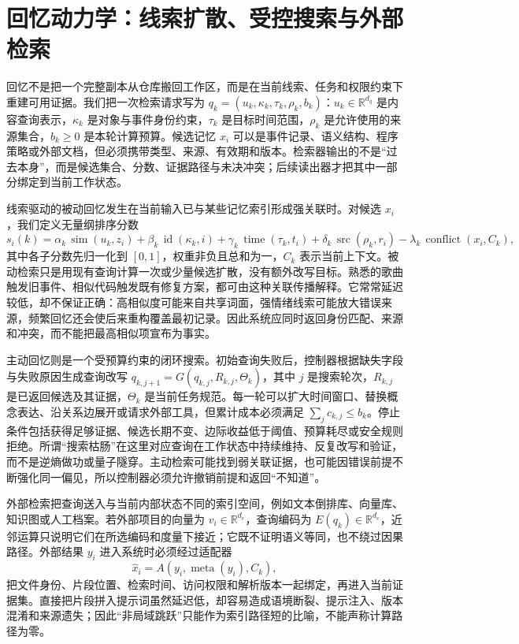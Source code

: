 \section{回忆动力学：线索扩散、受控搜索与外部检索}
\label{sec:recall_dynamics}
回忆不是把一个完整副本从仓库搬回工作区，而是在当前线索、任务和权限约束下重建可用证据。我们把一次检索请求写为 $q_k=(u_k,\kappa_k,\tau_k,\rho_k,b_k)$：$u_k\in\mathbb R^{d_q}$ 是内容查询表示，$\kappa_k$ 是对象与事件身份约束，$\tau_k$ 是目标时间范围，$\rho_k$ 是允许使用的来源集合，$b_k\geq0$ 是本轮计算预算。候选记忆 $x_i$ 可以是事件记录、语义结构、程序策略或外部文档，但必须携带类型、来源、有效期和版本。检索器输出的不是“过去本身”，而是候选集合、分数、证据路径与未决冲突；后续读出器才把其中一部分绑定到当前工作状态。

线索驱动的被动回忆发生在当前输入已与某些记忆索引形成强关联时。对候选 $x_i$，我们定义无量纲排序分数
\[
s_i(k)=\alpha_k\,\operatorname{sim}(u_k,z_i)
+\beta_k\,\operatorname{id}(\kappa_k,i)
+\gamma_k\,\operatorname{time}(\tau_k,t_i)
+\delta_k\,\operatorname{src}(\rho_k,r_i)
-\lambda_k\,\operatorname{conflict}(x_i,C_k),
\]
其中各子分数先归一化到 $[0,1]$，权重非负且总和为一，$C_k$ 表示当前上下文。被动检索只是用现有查询计算一次或少量候选扩散，没有额外改写目标。熟悉的歌曲触发旧事件、相似代码触发既有修复方案，都可由这种关联传播解释。它常常延迟较低，却不保证正确：高相似度可能来自共享词面，强情绪线索可能放大错误来源，频繁回忆还会使后来重构覆盖最初记录。因此系统应同时返回身份匹配、来源和冲突，而不能把最高相似项宣布为事实。

主动回忆则是一个受预算约束的闭环搜索。初始查询失败后，控制器根据缺失字段与失败原因生成查询改写 $q_{k,j+1}=G(q_{k,j},R_{k,j},\Theta_k)$，其中 $j$ 是搜索轮次，$R_{k,j}$ 是已返回候选及其证据，$\Theta_k$ 是当前任务规范。每一轮可以扩大时间窗口、替换概念表达、沿关系边展开或请求外部工具，但累计成本必须满足 $\sum_j c_{k,j}\leq b_k$。停止条件包括获得足够证据、候选长期不变、边际收益低于阈值、预算耗尽或安全规则拒绝。所谓“搜索枯肠”在这里对应查询在工作状态中持续维持、反复改写和验证，而不是逆熵做功或量子隧穿。主动检索可能找到弱关联证据，也可能因错误前提不断强化同一偏见，所以控制器必须允许撤销前提和返回“不知道”。

外部检索把查询送入与当前内部状态不同的索引空间，例如文本倒排库、向量库、知识图或人工档案。若外部项目的向量为 $v_i\in\mathbb R^{d_e}$，查询编码为 $E(q_k)\in\mathbb R^{d_e}$，近邻运算只说明它们在所选编码和度量下接近；它既不证明语义等同，也不绕过因果路径。外部结果 $y_i$ 进入系统时必须经过适配器
\[
\hat x_i=A\!\left(y_i,\operatorname{meta}(y_i),C_k\right),
\]
把文件身份、片段位置、检索时间、访问权限和解析版本一起绑定，再进入当前证据集。直接把片段拼入提示词虽然延迟低，却容易造成语境断裂、提示注入、版本混淆和来源遗失；因此“非局域跳跃”只能作为索引路径短的比喻，不能声称计算路径为零。

